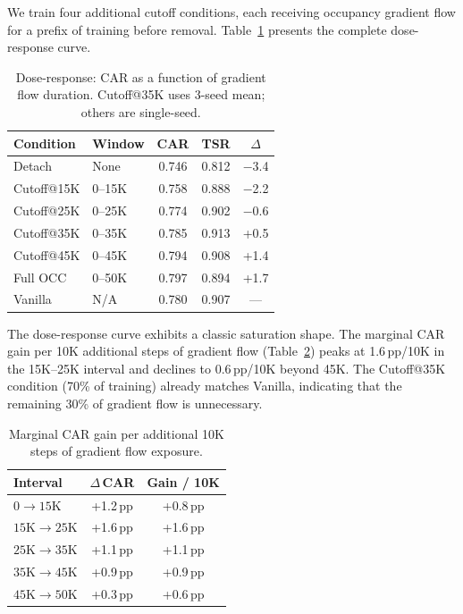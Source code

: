 \documentclass[10pt,twocolumn]{article}
\begin{document}
We train four additional cutoff conditions, each receiving occupancy gradient flow for a prefix of training before removal.
Table~\ref{tab:dose} presents the complete dose-response curve.

\begin{table}[t]
\centering
\caption{Dose-response: CAR as a function of gradient flow duration. Cutoff@35K uses 3-seed mean; others are single-seed.}
\label{tab:dose}
\small
\begin{tabular}{@{}llccc@{}}
\toprule
Condition & Window & CAR & TSR & $\Delta$ \\
\midrule
Detach       & None     & 0.746 & 0.812 & $-$3.4 \\
Cutoff@15K   & 0--15K   & 0.758 & 0.888 & $-$2.2 \\
Cutoff@25K   & 0--25K   & 0.774 & 0.902 & $-$0.6 \\
Cutoff@35K   & 0--35K   & 0.785 & 0.913 & +0.5 \\
Cutoff@45K   & 0--45K   & 0.794 & 0.908 & +1.4 \\
Full OCC     & 0--50K   & 0.797 & 0.894 & +1.7 \\
\midrule
Vanilla      & N/A      & 0.780 & 0.907 & --- \\
\bottomrule
\end{tabular}
\end{table}

The dose-response curve exhibits a classic saturation shape.
The marginal CAR gain per 10K additional steps of gradient flow (Table~\ref{tab:marginal}) peaks at 1.6\,pp/10K in the 15K--25K interval and declines to 0.6\,pp/10K beyond 45K.
The Cutoff@35K condition (70\% of training) already matches Vanilla, indicating that the remaining 30\% of gradient flow is unnecessary.

\begin{table}[t]
\centering
\caption{Marginal CAR gain per additional 10K steps of gradient flow exposure.}
\label{tab:marginal}
\small
\begin{tabular}{@{}lcc@{}}
\toprule
Interval & $\Delta$\,CAR & Gain / 10K \\
\midrule
$0 \to 15\text{K}$   & +1.2\,pp & +0.8\,pp \\
$15\text{K} \to 25\text{K}$ & +1.6\,pp & +1.6\,pp \\
$25\text{K} \to 35\text{K}$ & +1.1\,pp & +1.1\,pp \\
$35\text{K} \to 45\text{K}$ & +0.9\,pp & +0.9\,pp \\
$45\text{K} \to 50\text{K}$ & +0.3\,pp & +0.6\,pp \\
\bottomrule
\end{tabular}
\end{table}
\end{document}
